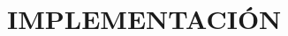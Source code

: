 \chapter[Implementación]{
  \label{chp:implementacion}
  IMPLEMENTACIÓN
}
\thispagestyle{numberingStyle}
\pagestyle{numberingStyle}